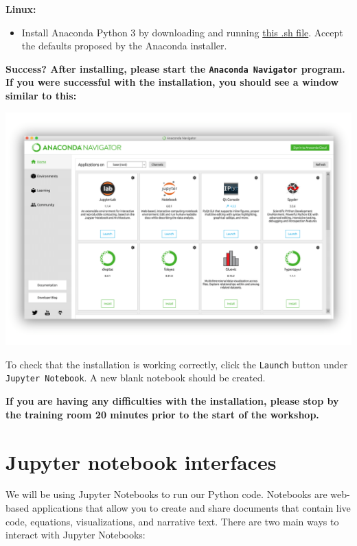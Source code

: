 \documentclass[
]{book}
\providecommand{\tightlist}{%
  \setlength{\itemsep}{0pt}\setlength{\parskip}{0pt}}
\begin{document}
\textbf{Linux:}

\begin{itemize}
\tightlist
\item
  Install Anaconda Python 3 by downloading and running \href{https://repo.anaconda.com/archive/Anaconda3-2019.10-Linux-x86_64.sh}{this .sh file}. Accept the defaults proposed by the Anaconda installer.
\end{itemize}

\textbf{Success? After installing, please start the \texttt{Anaconda\ Navigator} program. If you were successful with the installation, you should see a window similar to this:}

\includegraphics{Python/PythonInstall/images/Anaconda_navigator.png}

To check that the installation is working correctly, click the \texttt{Launch} button under \texttt{Jupyter\ Notebook}. A new blank notebook should be created.

\textbf{If you are having any difficulties with the installation, please stop by the training room 20 minutes prior to the start of the workshop.}

\hypertarget{jupyter-notebook-interfaces}{%
\section{Jupyter notebook interfaces}\label{jupyter-notebook-interfaces}}

We will be using Jupyter Notebooks to run our Python code. Notebooks are web-based applications that allow you to create and share documents that contain live code, equations, visualizations, and narrative text. There are two main ways to interact with Jupyter Notebooks:
\end{document}
